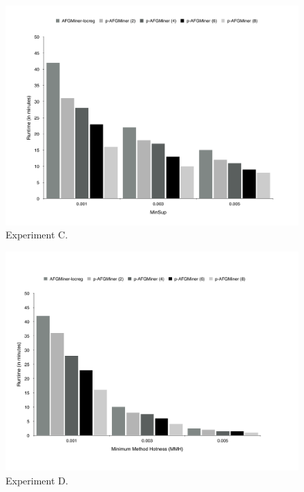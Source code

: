 \begin{figure}[h!]
\centering
    \includegraphics[scale=0.2]{figures/experimentC.pdf}
    \caption{Experiment C.}
    \label{fig:Plot3}  
\end{figure}

\begin{figure}[h!]
\centering
    \includegraphics[scale=0.2]{figures/experimentD.pdf}
    \caption{Experiment D.}
    \label{fig:Plot4}  
\end{figure}
